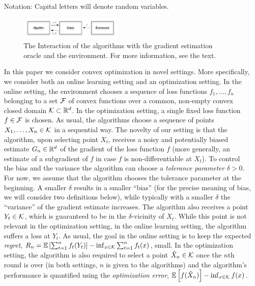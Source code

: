 
Notation: Capital letters will denote random variables.


\begin{figure}
\begin{center}
\includegraphics[width=0.45\textwidth]{figs/oracle}
\end{center}
\caption{The Interaction of the algorithms with the gradient estimation oracle and the environment. For more information, see the text.}
\label{fig:oracle}
\end{figure}

In this paper we consider convex optimization in novel settings. 
More specifically, we consider both an online learning setting and an optimization setting.
In the online setting, the environment chooses a sequence of loss functions $f_1,\dots,f_n$ belonging to a set $\mathcal{F}$ of convex functions over a common, non-empty convex closed domain $\mathcal{K}\subset \mathbb{R}^d$. 
In the optimization setting, a single fixed loss function $f\in \mathcal{F}$ is chosen.
As usual, the algorithms choose a sequence of points $X_1,\dots,X_n\in \mathcal{K}$ in a sequential way. 
The novelty of our setting is that the algorithm, upon selecting point $X_t$, receives 
a noisy and potentially biased estimate $G_n\in \mathbb{R}^d$ 
of the gradient of the loss function $f$ (more generally, an estimate of a subgradient of $f$ in case $f$ is non-differentiable at $X_t$). 
To control the bias and the variance the algorithm can choose a \emph{tolerance parameter} $\delta>0$. 
For now, we assume that the algorithm chooses the tolerance parameter at the beginning. 
A smaller $\delta$ results in a smaller ``bias'' (for the precise meaning of bias, we will consider two definitions below), while typically with a smaller $\delta$ the ``variance'' of the gradient estimate increases.
The algorithm also receives a point $Y_t\in \mathcal{K}$, which is guaranteed to be in the $\delta$-vicinity of $X_t$. While this point is not relevant in the optimization setting, in the online learning setting, the algorithm suffers a loss at $Y_t$.
As usual, the goal in the online setting is to keep the expected \emph{regret}, 
	$R_n =\mathbb{E}\left[ \sum_{t=1}^n f_t(Y_t)\right] - \inf_{x\in \mathcal{K}} \sum_{t=1}^n f_t(x)$,
small.
In the optimization setting, the algorithm is also required to select a point $\hat{X}_n\in \mathcal{K}$ once
the $n$th round is over (in both settings, $n$ is given to the algorithms)
and the algorithm's performance is quantified using the \emph{optimization error}, $\mathbb{E}\left[f(\hat{X}_n)\right] - \inf_{x\in \mathcal{K}} f(x) $.

